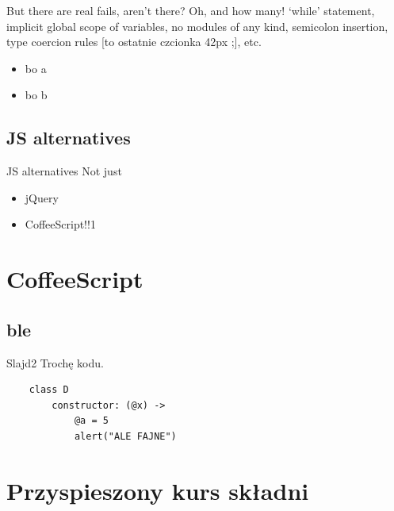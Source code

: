 \documentclass[xcolor=dvipsnames]{beamer}
\begin{document}
\begin{frame}[fragile]{But there are real fails, aren't there?}
    Oh, and how many!
    `while' statement, implicit global scope of variables, no modules of any 
    kind, semicolon insertion, type coercion rules [to ostatnie czcionka 42px ;], etc.
    \begin{itemize}
        \item bo a
        \item bo b
    \end{itemize}
\end{frame}

\subsection{JS alternatives}

\begin{frame}[fragile]{JS alternatives}
    Not just

    \begin{itemize}
        \item jQuery
        \pause   %
        \item CoffeeScript!!1
    \end{itemize}
\end{frame}

\section{CoffeeScript}

\subsection{ble}

\begin{frame}[fragile]{Slajd2}
    Trochę kodu.

    \begin{verbatim}
    class D
        constructor: (@x) ->
            @a = 5
            alert("ALE FAJNE")
    \end{verbatim}
\end{frame}

\section{Przyspieszony kurs składni}
\end{document}
